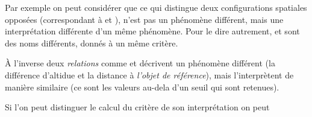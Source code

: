 Par exemple on peut considérer que ce qui distingue deux configurations spatiales opposées (\eg correspondant à  et ), n'est pas un phénomène différent, mais une interprétation différente d'un même phénomène. Pour le dire autrement,  et  sont des noms différents, donnés à un même critère.

À l'inverse deux \emph{relations} comme  et  décrivent un phénomène différent (\ie la différence d'altidue et la distance à \emph{l'objet de référence}), mais l’interprètent de manière similaire (ce sont les valeurs au-dela d'un seuil qui sont retenues).

%
Si l'on peut distinguer le calcul du critère de son interprétation on peut

